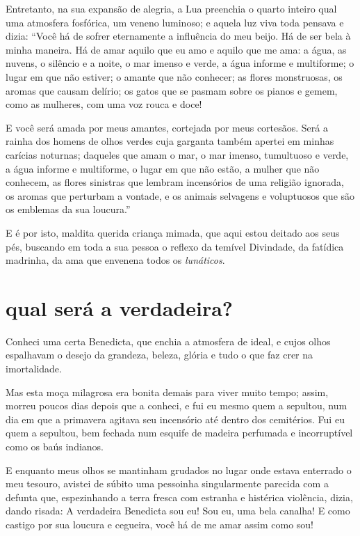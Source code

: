 Entretanto, na sua expansão de alegria, a Lua preenchia o quarto inteiro 
qual uma atmosfera fosfórica, um veneno luminoso; e aquela 
luz viva toda pensava e dizia: “Você há de sofrer eternamente
a influência do meu beijo. Há de ser bela à minha maneira. Há de amar
aquilo que eu amo e aquilo que me ama: a água, as nuvens, o silêncio e
a noite, o mar imenso e verde, a água informe e multiforme; o lugar em
que não estiver; o amante que não conhecer; as flores monstruosas, os
aromas que causam delírio; os gatos que se pasmam sobre os pianos e
gemem, como as mulheres, com uma voz rouca e doce!

E você será amada por meus amantes, cortejada por meus
cortesãos. Será a rainha dos homens de olhos verdes cuja
garganta também apertei em minhas carícias noturnas; daqueles que amam
o mar, o mar imenso, tumultuoso e verde, a água informe e multiforme, o
lugar em que não estão, a mulher que não conhecem, as flores sinistras
que lembram incensórios de uma religião ignorada, os
aromas que perturbam a vontade, e os animais selvagens e voluptuosos
que são os emblemas da sua loucura.''

E é por isto, maldita querida criança mimada, que aqui estou deitado
aos seus pés, buscando em toda a sua pessoa o reflexo da temível
Divindade, da fatídica madrinha, da ama que envenena todos os
\textit{lunáticos}.

\quebra\section[Qual será a verdadeira?]{qual será a verdadeira?}

Conheci uma certa Benedicta, que enchia a atmosfera de ideal, e cujos
olhos espalhavam o desejo da grandeza, beleza, glória e tudo o
que faz crer na imortalidade.

Mas esta moça milagrosa era bonita demais para viver muito tempo;
assim, morreu poucos dias depois que a conheci, e fui eu
mesmo quem a sepultou, num dia em que a primavera agitava seu
incensório até dentro dos cemitérios. Fui eu quem a sepultou, bem
fechada num esquife de madeira perfumada e incorruptível como os baús
indianos.

E enquanto meus olhos se mantinham grudados no lugar onde estava enterrado
o meu tesouro, avistei de súbito uma pessoinha singularmente parecida com a defunta que, espezinhando a terra fresca com 
estranha e histérica violência, dizia, dando risada:
A verdadeira Benedicta sou eu! Sou eu, uma bela
canalha! E como castigo por sua loucura e cegueira, você há de me amar assim
como sou!

